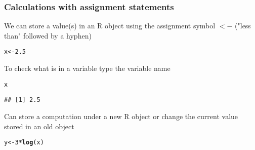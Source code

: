 \documentclass{beamer}\usepackage[]{graphicx}\usepackage[]{color}
\makeatletter
\newcommand{\hlnum}[1]{\textcolor[rgb]{0.686,0.059,0.569}{#1}}%
\newcommand{\hlopt}[1]{\textcolor[rgb]{0,0,0}{#1}}%
\newcommand{\hlstd}[1]{\textcolor[rgb]{0.345,0.345,0.345}{#1}}%
\newcommand{\hlkwb}[1]{\textcolor[rgb]{0.69,0.353,0.396}{#1}}%
\newcommand{\hlkwd}[1]{\textcolor[rgb]{0.737,0.353,0.396}{\textbf{#1}}}%
\newenvironment{kframe}{%
 \def\at@end@of@kframe{}%
 \ifinner\ifhmode%
  \def\at@end@of@kframe{\end{minipage}}%
  \begin{minipage}{\columnwidth}%
 \fi\fi%
 \def\FrameCommand##1{\hskip\@totalleftmargin \hskip-\fboxsep
 \colorbox{shadecolor}{##1}\hskip-\fboxsep
     \hskip-\linewidth \hskip-\@totalleftmargin \hskip\columnwidth}%
 \MakeFramed {\advance\hsize-\width
   \@totalleftmargin\z@ \linewidth\hsize
   \@setminipage}}%
 {\par\unskip\endMakeFramed%
 \at@end@of@kframe}
\newenvironment{knitrout}{}{} %
\makeatother
\begin{document}
\begin{frame}[fragile]\frametitle{Calculations with assignment statements}
We can store a value(s) in an R object using the assignment symbol $<-$ ("less than" followed by a hyphen)
\begin{knitrout}
\color{fgcolor}\begin{kframe}
\begin{alltt}
\hlstd{x} \hlkwb{<-} \hlnum{2.5}
\end{alltt}
\end{kframe}
\end{knitrout}
To check what is in a variable type the variable name
\begin{knitrout}
\color{fgcolor}\begin{kframe}
\begin{alltt}
\hlstd{x}
\end{alltt}
\begin{verbatim}
## [1] 2.5
\end{verbatim}
\end{kframe}
\end{knitrout}
Can store a computation under a new R object or change the current value stored in an old object
\begin{knitrout}
\color{fgcolor}\begin{kframe}
\begin{alltt}
\hlstd{y} \hlkwb{<-} \hlnum{3} \hlopt{*} \hlkwd{log}\hlstd{(x)}
\end{alltt}
\end{kframe}
\end{knitrout}
\end{frame}
\end{document}

